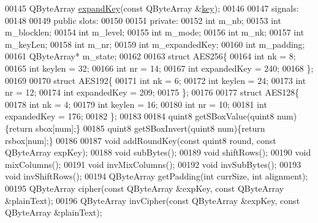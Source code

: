 \begin{DoxyCode}
00145     QByteArray \hyperlink{class_q_a_e_s_encryption_a5bfbb972f84a8376fceed648553c0912}{expandKey}(\textcolor{keyword}{const} QByteArray &\hyperlink{namespace_errors_dict_setup_a09c268098d09ffb8e5504f30fa6d5dd9}{key});
00146 
00147 signals:
00148 
00149 \textcolor{keyword}{public} slots:
00150 
00151 \textcolor{keyword}{private}:
00152     \textcolor{keywordtype}{int} m\_nb;
00153     \textcolor{keywordtype}{int} m\_blocklen;
00154     \textcolor{keywordtype}{int} m\_level;
00155     \textcolor{keywordtype}{int} m\_mode;
00156     \textcolor{keywordtype}{int} m\_nk;
00157     \textcolor{keywordtype}{int} m\_keyLen;
00158     \textcolor{keywordtype}{int} m\_nr;
00159     \textcolor{keywordtype}{int} m\_expandedKey;
00160     \textcolor{keywordtype}{int} m\_padding;
00161     QByteArray* m\_state;
00162 
00163     \textcolor{keyword}{struct }AES256\{
00164         \textcolor{keywordtype}{int} nk = 8;
00165         \textcolor{keywordtype}{int} keylen = 32;
00166         \textcolor{keywordtype}{int} nr = 14;
00167         \textcolor{keywordtype}{int} expandedKey = 240;
00168     \};
00169 
00170     \textcolor{keyword}{struct }AES192\{
00171         \textcolor{keywordtype}{int} nk = 6;
00172         \textcolor{keywordtype}{int} keylen = 24;
00173         \textcolor{keywordtype}{int} nr = 12;
00174         \textcolor{keywordtype}{int} expandedKey = 209;
00175     \};
00176 
00177     \textcolor{keyword}{struct }AES128\{
00178         \textcolor{keywordtype}{int} nk = 4;
00179         \textcolor{keywordtype}{int} keylen = 16;
00180         \textcolor{keywordtype}{int} nr = 10;
00181         \textcolor{keywordtype}{int} expandedKey = 176;
00182     \};
00183 
00184     quint8 getSBoxValue(quint8 num)\{\textcolor{keywordflow}{return} sbox[num];\}
00185     quint8 getSBoxInvert(quint8 num)\{\textcolor{keywordflow}{return} rsbox[num];\}
00186 
00187     \textcolor{keywordtype}{void} addRoundKey(\textcolor{keyword}{const} quint8 round, \textcolor{keyword}{const} QByteArray expKey);
00188     \textcolor{keywordtype}{void} subBytes();
00189     \textcolor{keywordtype}{void} shiftRows();
00190     \textcolor{keywordtype}{void} mixColumns();
00191     \textcolor{keywordtype}{void} invMixColumns();
00192     \textcolor{keywordtype}{void} invSubBytes();
00193     \textcolor{keywordtype}{void} invShiftRows();
00194     QByteArray getPadding(\textcolor{keywordtype}{int} currSize, \textcolor{keywordtype}{int} alignment);
00195     QByteArray cipher(\textcolor{keyword}{const} QByteArray &expKey, \textcolor{keyword}{const} QByteArray &plainText);
00196     QByteArray invCipher(\textcolor{keyword}{const} QByteArray &expKey, \textcolor{keyword}{const} QByteArray &plainText);

\end{DoxyCode}
